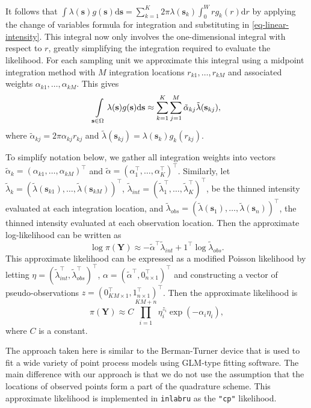 \documentclass{statsoc}
\newcommand{\bs}{\mathbf{s}}
\newcommand{\bm}{\boldsymbol}  %
\newcommand{\tl}{\tilde{\lambda}}   %
\begin{document}
It follows that $\int \lambda(\bs)g(\bs) \mathrm{d}\bs = \sum_{k=1}^K 2\pi \lambda(\bs_k) \int_0^W r g_k(r)\mathrm{d}r$ by applying the change of variables formula for integration and substituting in \eqref{eq-linear-intensity}.  This integral now only involves the one-dimensional integral with respect to $r$, greatly simplifying the integration required to evaluate the likelihood.  For each sampling unit we approximate this integral using a midpoint integration method with $M$ integration locations $r_{k1}, \ldots, r_{kM}$ and associated weights $\alpha_{k1}, \ldots, \alpha_{kM}$.  This gives
\begin{equation*}
	\int\displaylimits_{\bs \in \Omega} \lambda(\bs)g(\bs)\mathrm{d}\bs \approx \sum_{k=1}^K \sum_{j=1}^M \tilde{\alpha}_{kj} \tl(\bs_{kj}),
\end{equation*}
where $\tilde{\alpha}_{kj} = 2\pi \alpha_{kj}r_{kj}$ and $\tl(\bs_{kj}) = \lambda(\bs_k) g_k(r_{kj})$.

To simplify notation below, we gather all integration weights into vectors $\tilde{\alpha}_{k} = (\alpha_{k1}, \ldots, \alpha_{kM})^\intercal$ and $\tilde{\alpha} = (\alpha_1^\intercal, \ldots, \alpha_K^\intercal)^\intercal$.  Similarly, let $\tl_k = (\tl(\bs_{k1}), \ldots, \tl(\bs_{kM}))^\intercal$, $\tl_{int} = (\tl_1^\intercal, \ldots, \tl_K^\intercal)^\intercal$, be the thinned intensity evaluated at each integration location, and $\tl_{obs} = (\tl(\bs_1), \ldots, \tl(\bs_n))^\intercal$, the thinned intensity evaluated at each observation location.  Then the approximate log-likelihood can be written as
\begin{equation}
\label{approx-log-likelihood}
	\log \pi(\bm{Y}) \approx - \tilde{\alpha}^\intercal \tl_{int} + 1^\intercal\log\tl_{obs}.
\end{equation}
This approximate likelihood can be expressed as a modified Poisson likelihood by letting $\eta = (\tl_{int}^\intercal, \tl_{obs}^\intercal)^\intercal$,
$\alpha = (\tilde{\alpha}^\intercal, 0_{n \times 1}^\intercal)^\intercal$ and constructing a vector of pseudo-observations $z = (0_{KM\times 1}^\intercal, 1_{n \times 1}^\intercal)^\intercal$.  Then the approximate likelihood is
\begin{equation}
\pi(\bm{Y}) \approx C \prod\limits_{i=1}^{KM + n} \eta_i^{z_i}\exp(-\alpha_i\eta_i),
\end{equation}
where $C$ is a constant.

The approach taken here is similar to the Berman-Turner device \citep{baddeley_practical_2000, berman_approximating_1992} that is used to fit a wide variety of point process models using GLM-type fitting software.  The main difference with our approach is that we do not use the assumption that the locations of observed points form a part of the quadrature scheme. This approximate likelihood is implemented in \texttt{inlabru} as the \texttt{"cp"} likelihood.
\end{document}

